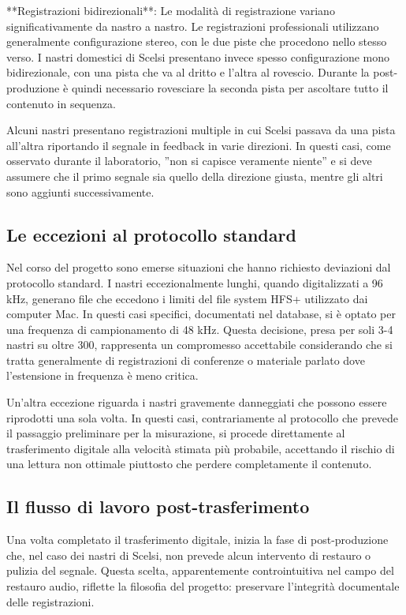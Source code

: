 **Registrazioni bidirezionali**: Le modalità di registrazione variano significativamente da nastro a nastro. Le registrazioni professionali utilizzano generalmente configurazione stereo, con le due piste che procedono nello stesso verso. I nastri domestici di Scelsi presentano invece spesso configurazione mono bidirezionale, con una pista che va al dritto e l'altra al rovescio. Durante la post-produzione è quindi necessario rovesciare la seconda pista per ascoltare tutto il contenuto in sequenza.

Alcuni nastri presentano registrazioni multiple in cui Scelsi passava da una pista all'altra riportando il segnale in feedback in varie direzioni. In questi casi, come osservato durante il laboratorio, ''non si capisce veramente niente'' e si deve assumere che il primo segnale sia quello della direzione giusta, mentre gli altri sono aggiunti successivamente.
\subsection{Le eccezioni al protocollo standard}
Nel corso del progetto sono emerse situazioni che hanno richiesto deviazioni dal protocollo standard. I nastri eccezionalmente lunghi, quando digitalizzati a 96 kHz, generano file che eccedono i limiti del file system HFS+ utilizzato dai computer Mac. In questi casi specifici, documentati nel database, si è optato per una frequenza di campionamento di 48 kHz. Questa decisione, presa per soli 3-4 nastri su oltre 300, rappresenta un compromesso accettabile considerando che si tratta generalmente di registrazioni di conferenze o materiale parlato dove l'estensione in frequenza è meno critica.

Un'altra eccezione riguarda i nastri gravemente danneggiati che possono essere riprodotti una sola volta. In questi casi, contrariamente al protocollo che prevede il passaggio preliminare per la misurazione, si procede direttamente al trasferimento digitale alla velocità stimata più probabile, accettando il rischio di una lettura non ottimale piuttosto che perdere completamente il contenuto.
\subsection{Il flusso di lavoro post-trasferimento}
Una volta completato il trasferimento digitale, inizia la fase di post-produzione che, nel caso dei nastri di Scelsi, non prevede alcun intervento di restauro o pulizia del segnale. Questa scelta, apparentemente controintuitiva nel campo del restauro audio, riflette la filosofia del progetto: preservare l'integrità documentale delle registrazioni\cite[p. 188]{pro:beracpmm4ch2011}.

